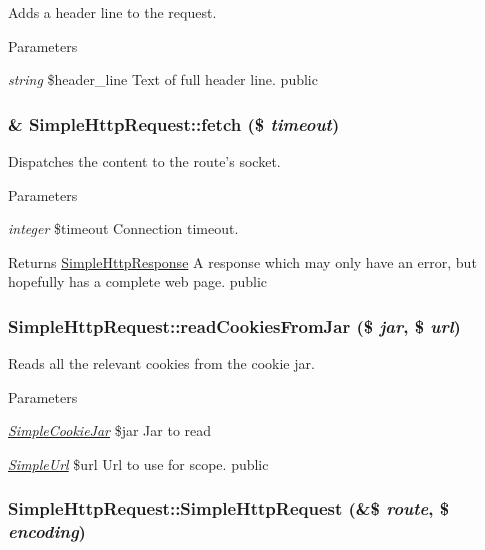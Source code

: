 \label{class_simple_http_request_ac0309917a5be6411e7a87fc50fbb4304}
Adds a header line to the request. 
\begin{DoxyParams}{Parameters}
\item[{\em string}]\$header\_\-line Text of full header line.  public \end{DoxyParams}
\hypertarget{class_simple_http_request_ad343424c442a16dfbe62dddb52b02092}{
\subsubsection[{fetch}]{\setlength{\rightskip}{0pt plus 5cm}\& SimpleHttpRequest::fetch (\$ {\em timeout})}}
\label{class_simple_http_request_ad343424c442a16dfbe62dddb52b02092}
Dispatches the content to the route's socket. 
\begin{DoxyParams}{Parameters}
\item[{\em integer}]\$timeout Connection timeout. \end{DoxyParams}
\begin{DoxyReturn}{Returns}
\hyperlink{class_simple_http_response}{SimpleHttpResponse} A response which may only have an error, but hopefully has a complete web page.  public 
\end{DoxyReturn}
\hypertarget{class_simple_http_request_ac5604262cc0cb2dc429b734b8806d64b}{
\subsubsection[{readCookiesFromJar}]{\setlength{\rightskip}{0pt plus 5cm}SimpleHttpRequest::readCookiesFromJar (\$ {\em jar}, \/  \$ {\em url})}}
\label{class_simple_http_request_ac5604262cc0cb2dc429b734b8806d64b}
Reads all the relevant cookies from the cookie jar. 
\begin{DoxyParams}{Parameters}
\item[{\em \hyperlink{class_simple_cookie_jar}{SimpleCookieJar}}]\$jar Jar to read \item[{\em \hyperlink{class_simple_url}{SimpleUrl}}]\$url Url to use for scope.  public \end{DoxyParams}
\hypertarget{class_simple_http_request_a44123ae07ac9e6dd385b107460e8f4ba}{
\subsubsection[{SimpleHttpRequest}]{\setlength{\rightskip}{0pt plus 5cm}SimpleHttpRequest::SimpleHttpRequest (\&\$ {\em route}, \/  \$ {\em encoding})}}
